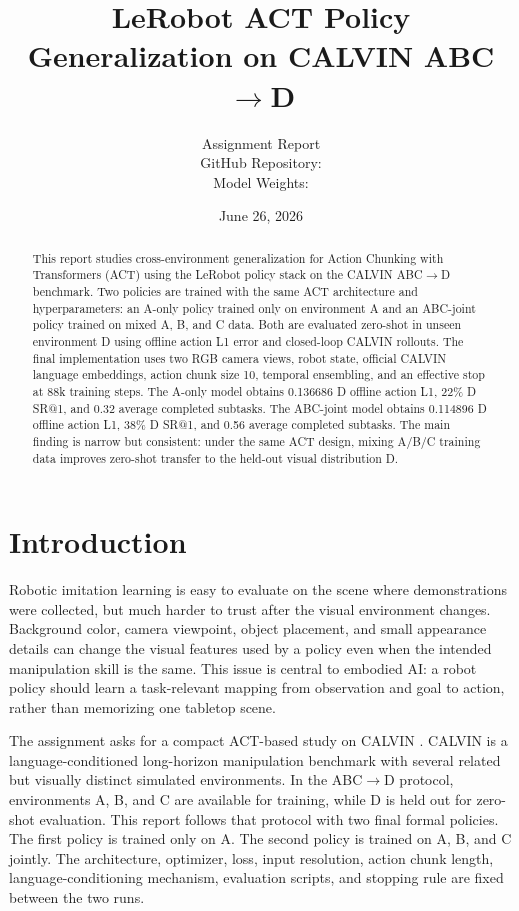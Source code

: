 \documentclass[10pt,twocolumn]{article}
\title{\vspace{-0.55in}\textbf{LeRobot ACT Policy Generalization on CALVIN ABC$\rightarrow$D}}
\author{
  Assignment Report\\
  GitHub Repository: \githuburl\\
  Model Weights: \weightsurl
}
\date{June 26, 2026}
\begin{document}
\maketitle
\sloppy

\begin{abstract}
This report studies cross-environment generalization for Action Chunking with Transformers (ACT) using the LeRobot policy stack on the CALVIN ABC$\rightarrow$D benchmark. Two policies are trained with the same ACT architecture and hyperparameters: an A-only policy trained only on environment A and an ABC-joint policy trained on mixed A, B, and C data. Both are evaluated zero-shot in unseen environment D using offline action L1 error and closed-loop CALVIN rollouts. The final implementation uses two RGB camera views, robot state, official CALVIN language embeddings, action chunk size 10, temporal ensembling, and an effective stop at 88k training steps. The A-only model obtains 0.136686 D offline action L1, 22\% D SR@1, and 0.32 average completed subtasks. The ABC-joint model obtains 0.114896 D offline action L1, 38\% D SR@1, and 0.56 average completed subtasks. The main finding is narrow but consistent: under the same ACT design, mixing A/B/C training data improves zero-shot transfer to the held-out visual distribution D.
\end{abstract}

\section{Introduction}

Robotic imitation learning is easy to evaluate on the scene where demonstrations were collected, but much harder to trust after the visual environment changes. Background color, camera viewpoint, object placement, and small appearance details can change the visual features used by a policy even when the intended manipulation skill is the same. This issue is central to embodied AI: a robot policy should learn a task-relevant mapping from observation and goal to action, rather than memorizing one tabletop scene.

The assignment asks for a compact ACT-based study on CALVIN \cite{mees2022calvin}. CALVIN is a language-conditioned long-horizon manipulation benchmark with several related but visually distinct simulated environments. In the ABC$\rightarrow$D protocol, environments A, B, and C are available for training, while D is held out for zero-shot evaluation. This report follows that protocol with two final formal policies. The first policy is trained only on A. The second policy is trained on A, B, and C jointly. The architecture, optimizer, loss, input resolution, action chunk length, language-conditioning mechanism, evaluation scripts, and stopping rule are fixed between the two runs.
\end{document}
